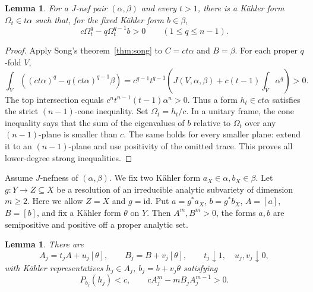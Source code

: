 \documentclass[reqno]{amsart}
\theoremstyle{remark}
\theoremstyle{plain}
\newtheorem{lemma}[thm]{Lemma}
\begin{document}
\begin{samepage}
\begin{lemma}\label{lem:ambient-approximation}
For a \(J\)-nef pair $(\alpha,\beta)$ and every \(t>1\), there is a K\"ahler form \(\Omega_t\in t\alpha\) such that, for the fixed K\"ahler form \(b\in\beta\),
\[
c\Omega_t^q-q\Omega_t^{q-1}b>0\qquad(1\le q\le n-1).
\]

\end{lemma}
\end{samepage}

\begin{proof}
Apply Song's theorem~\ref{thm:song} to \(C=ct\alpha\) and \(B=\beta\). For each proper \(q\)-fold \(V\),
\[
\int_V((ct\alpha)^q-q(ct\alpha)^{q-1}\beta)
=c^{q-1}t^{q-1}\left(J(V,\alpha,\beta)+c(t-1)\int_V\alpha^q\right)>0.
\]
The top intersection equals \(c^nt^{n-1}(t-1)\alpha^n>0\). Thus a form \(h_t\in ct\alpha\) satisfies the strict \((n-1)\)-cone inequality. Set \(\Omega_t=h_t/c\). In a unitary frame, the cone inequality says that the sum of the eigenvalues of \(b\) relative to \(\Omega_t\) over any \((n-1)\)-plane is smaller than \(c\). The same holds for every smaller plane: extend it to an \((n-1)\)-plane and use positivity of the omitted trace. This proves all lower-degree strong inequalities.
\end{proof}


\begin{samepage}
Assume  \(J\)-nefness of $(\alpha,\beta)$. We fix two K\"ahler form $a_X\in \alpha, b_X\in \beta$. Let \(g:Y\to Z\subseteq X\) be a resolution of an irreducible analytic subvariety of dimension \(m\ge2\). Here we allow \(Z=X\) and \(g=\mathrm{id}\). Put \(a=g^*a_X\), \(b=g^*b_X\), \(A=[a]\), \(B=[b]\), and fix a K\"ahler form \(\theta\) on \(Y\). Then \(A^m,B^m>0\), the forms \(a,b\) are semipositive and positive off a proper analytic set.
\begin{lemma}\label{lem:resolution-approximation}
 There are
\[
A_j=t_jA+u_j[\theta],\qquad B_j=B+v_j[\theta],\qquad
t_j\downarrow1,\quad u_j,v_j\downarrow0,
\]
with K\"ahler representatives \(h_j\in A_j\), \(b_j=b+v_j\theta\) satisfying
\begin{equation}\label{eq:resolved-cone}
P_{b_j}(h_j)<c,\qquad cA_j^m-mB_jA_j^{m-1}>0.
\end{equation}
\end{lemma}
\end{samepage}
\end{document}

